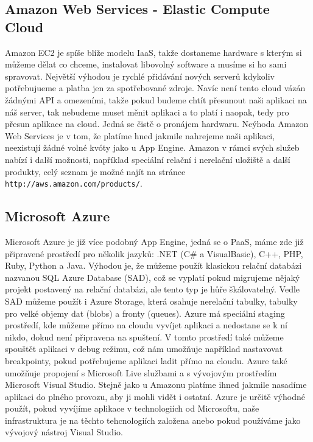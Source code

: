 \subsection{Amazon Web Services - Elastic Compute Cloud}
Amazon EC2 je spíše blíže modelu IaaS, takže dostaneme hardware s kterým si můžeme dělat co chceme, instalovat libovolný software a musíme si ho sami spravovat. Největší výhodou je rychlé přidávání nových serverů kdykoliv potřebujueme a platba jen za spotřebované zdroje. Navíc není tento cloud vázán žádnými API a omezeními, takže pokud budeme chtít přesunout naši aplikaci na náš server, tak nebudeme muset měnit aplikaci a to platí i naopak, tedy pro přesun aplikace na cloud. Jedná se čistě o pronájem hardwaru. Neýhoda Amazon Web Services je v tom, že platíme hned jakmile nahrejeme naši aplikaci, neexistují žádné volné kvóty jako u App Engine. Amazon v rámci svých služeb nabízí i další možnosti, například speciální relační i nerelační uložiště a další produkty, celý seznam je možné najít na stránce \verb|http://aws.amazon.com/products/|. 

\subsection{Microsoft Azure}
Microsoft Azure je již více podobný App Engine, jedná se o PaaS, máme zde již připravené prostředí pro několik jazyků: .NET (C\# a VisualBasic), C++, PHP, Ruby, Python a Java. Výhodou je, že můžeme použít klasickou relační databázi nazvanou SQL Azure Database (SAD), což se vyplatí pokud migrujeme nějaký projekt postavený na relační databázi, ale tento typ je hůře škálovatelný. Vedle SAD můžeme použít i Azure Storage, která osahuje nerelační tabulky, tabulky pro velké objemy dat (blobs) a fronty (queues). Azure má speciální staging prostředí, kde můžeme přímo na cloudu vyvíjet aplikaci a nedostane se k ní nikdo, dokud není připravena na spuštení. V tomto prostředí také můžeme spouštět aplikaci v debug režimu, což nám umožňuje například nastavovat breakpointy, pokud potřebujeme aplikaci ladit přímo na cloudu. Azure také umožňuje propojení s Microsoft Live službami a s vývojovým prostředím Microsoft Visual Studio. Stejně jako u Amazonu platíme ihned jakmile nasadíme aplikaci do plného provozu, aby ji mohli vidět i ostatní. Azure je určitě výhodné použít, pokud vyvíjíme aplikace v technologiích od Microsoftu, naše infrastruktura je na těchto tehcnologiích založena anebo pokud používáme jako vývojový nástroj Visual Studio.

